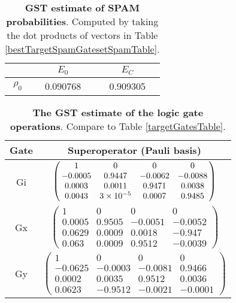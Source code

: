 {\begin{table}[h]
\begin{center}
\begin{tabular}[l]{|c|c|c|}
\hline
 & $E_{0}$ & $E_C$ \\ \hline
$\rho_{0}$ & 0.090768 & 0.909305 \\ \hline
\end{tabular}

\caption{\textbf{GST estimate of SPAM probabilities}.  Computed by taking the dot products of vectors in Table \ref{bestTargetSpamGatesetSpamTable}.\label{bestTargetSpamGatesetSpamParametersTable}}
\end{center}
\end{table}

\begin{table}[h]
\begin{center}
\begin{tabular}[l]{|c|c|}
\hline
Gate & Superoperator (Pauli basis) \\ \hline
Gi & $ \left(\!\!\begin{array}{cccc}
1 & 0 & 0 & 0 \\ 
-0.0005 & 0.9447 & -0.0062 & -0.0088 \\ 
0.0003 & 0.0011 & 0.9471 & 0.0038 \\ 
0.0043 & 3\times 10^{-5} & 0.0007 & 0.9485
 \end{array}\!\!\right) $
 \\ \hline
Gx & $ \left(\!\!\begin{array}{cccc}
1 & 0 & 0 & 0 \\ 
0.0005 & 0.9505 & -0.0051 & -0.0052 \\ 
0.0629 & 0.0009 & 0.0018 & -0.947 \\ 
0.063 & 0.0009 & 0.9512 & -0.0039
 \end{array}\!\!\right) $
 \\ \hline
Gy & $ \left(\!\!\begin{array}{cccc}
1 & 0 & 0 & 0 \\ 
-0.0625 & -0.0003 & -0.0081 & 0.9466 \\ 
0.0002 & 0.0035 & 0.9512 & 0.0036 \\ 
0.0623 & -0.9512 & -0.0021 & -0.0001
 \end{array}\!\!\right) $
 \\ \hline
\end{tabular}

\caption{\textbf{The GST estimate of the logic gate operations}.  Compare to Table \ref{targetGatesTable}.\label{bestTargetSpamGatesetGatesTable}}
\end{center}
\end{table}

}
